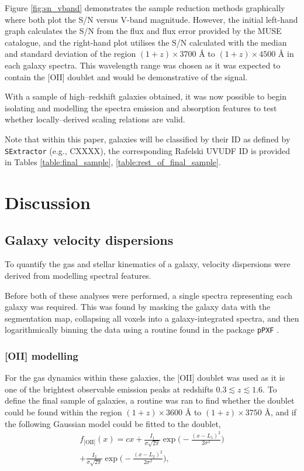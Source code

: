 \documentclass[12pt, twocolumn, nofootinbib]{revtex4-1}    %
\begin{document}
Figure \ref{fig:sn_vband} demonstrates the sample reduction methods graphically where both plot the S/N versus V-band magnitude. However, the initial left-hand graph calculates the S/N from the flux and flux error provided by the MUSE catalogue, and the right-hand plot utilises the S/N calculated with the median and standard deviation of the region $(1+z)\times3700$ {\AA} to $(1+z)\times4500$ {\AA} in each galaxy spectra. This wavelength range was chosen as it was expected to contain the [OII] doublet and would be demonstrative of the signal. 

With a sample of high--redshift galaxies obtained, it was now possible to begin isolating and modelling the spectra emission and absorption features to test whether locally--derived scaling relations are valid. 

Note that within this paper, galaxies will be classified by their ID as defined by \texttt{SExtractor} (e.g., CXXXX), the corresponding Rafelski UVUDF ID is provided in Tables \ref{table:final_sample}, \ref{table:rest_of_final_sample}.

\vspace{2ex} %
\section{Discussion} \label{sec:discussion}
\subsection{Galaxy velocity dispersions} \label{sec:disc_vel_disp}
\noindent
To quantify the gas and stellar kinematics of a galaxy, velocity dispersions were derived from modelling spectral features. 

Before both of these analyses were performed, a single spectra representing each galaxy was required. This was found by masking the galaxy data with the segmentation map, collapsing all voxels into a galaxy-integrated spectra, and then logarithmically binning the data using a routine found in the package \texttt{pPXF} \citep{2017MNRAS.466..798C}.

\vspace{2ex} %
\subsubsection{[OII] modelling} \label{sec:disc_oii_modelling}
\noindent
For the gas dynamics within these galaxies, the [OII] doublet was used as it is one of the brightest observable emission peaks at redshifts $0.3\lesssim z\lesssim 1.6$. To define the final sample of galaxies, a routine was ran to find whether the doublet could be found within the region $(1+z)\times3600$ {\AA} to $(1+z)\times3750$ {\AA}, and if the following Gaussian model could be fitted to the doublet,
\begin{multline}
f_{\text{[OII]}}(x) = cx + \frac{I_1}{\sigma \sqrt{2\pi}} \exp{\Bigg(-\frac{(x-L_1)^2}{2\sigma^2}\Bigg)} \\
+ \frac{I_2}{\sigma \sqrt{2\pi}} \exp{\Bigg(-\frac{(x-L_2)^2}{2\sigma^2}\Bigg)},
\label{eqn:doublet}
\end{multline} 
\end{document}
